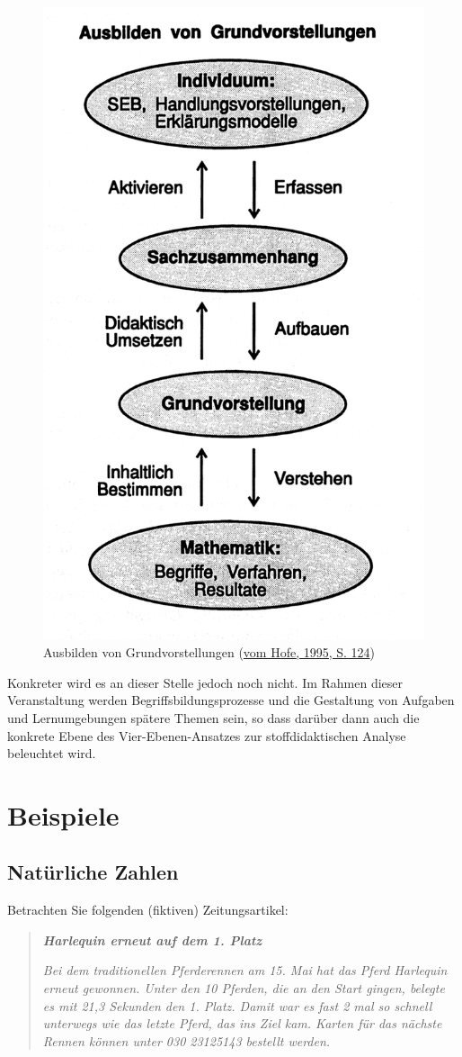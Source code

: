 \documentclass[
  ngerman,
]{scrbook}
\theoremstyle{definition}
\theoremstyle{definition}
\theoremstyle{definition}
\theoremstyle{definition}
\theoremstyle{remark}
\begin{document}
\begin{figure}

{\centering \includegraphics[width=0.5\linewidth]{pictures/4-GVausbilden} 

}

\caption{Ausbilden von Grundvorstellungen (\protect\hyperlink{ref-Hofe:1995}{vom Hofe, 1995, S. 124})}\label{fig:GVausbilden}
\end{figure}

Konkreter wird es an dieser Stelle jedoch noch nicht. Im Rahmen dieser Veranstaltung werden Begriffsbildungsprozesse und die Gestaltung von Aufgaben und Lernumgebungen spätere Themen sein, so dass darüber dann auch die \textcolor{concreteColor}{konkrete Ebene} des Vier-Ebenen-Ansatzes zur stoffdidaktischen Analyse beleuchtet wird.

\hypertarget{beispiele}{%
\section{Beispiele}\label{beispiele}}

\hypertarget{natuxfcrliche-zahlen}{%
\subsection{Natürliche Zahlen}\label{natuxfcrliche-zahlen}}

Betrachten Sie folgenden (fiktiven) Zeitungsartikel:

\begin{quote}
\textbf{\emph{Harlequin erneut auf dem 1. Platz}}

\emph{Bei dem traditionellen Pferderennen am 15. Mai hat das Pferd Harlequin erneut gewonnen. Unter den 10 Pferden, die an den Start gingen, belegte es mit 21,3 Sekunden den 1. Platz. Damit war es fast 2 mal so schnell unterwegs wie das letzte Pferd, das ins Ziel kam. Karten für das nächste Rennen können unter 030 23125143 bestellt werden.}
\end{quote}
\end{document}
